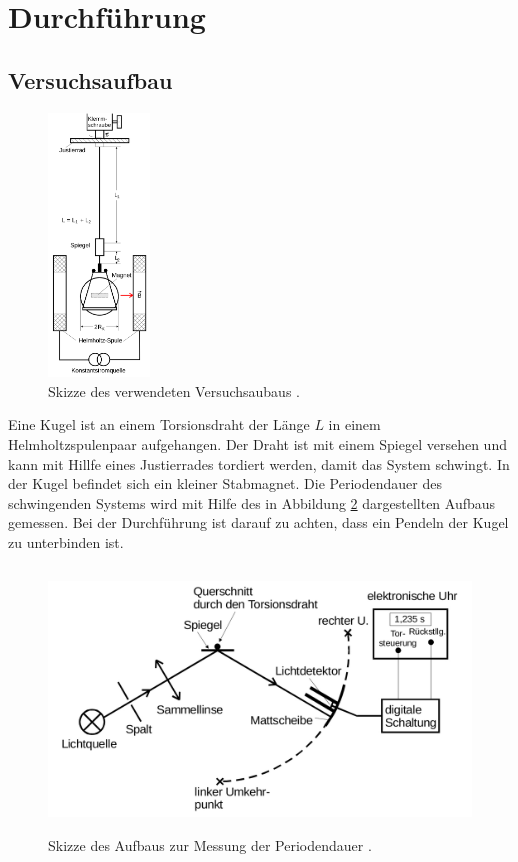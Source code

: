\newpage
\section{Durchführung}
\label{sec:Durchführung}

\subsection{Versuchsaufbau}
\label{sec:Aufbau}

\begin{figure}
  \centering
  \includegraphics[height=7.0cm]{content/Versuchsaufbau.jpg}
  \caption{Skizze des verwendeten Versuchsaubaus  \cite{anleitung}.}
  \label{fig:Versuchsaufbau1}
\end{figure}

Eine Kugel ist an einem Torsionsdraht der Länge $L$ in einem Helmholtzspulenpaar
aufgehangen. Der Draht ist mit einem Spiegel versehen und kann mit
Hillfe eines Justierrades
tordiert werden, damit das System schwingt.
In der Kugel befindet sich ein kleiner Stabmagnet.
Die Periodendauer des
schwingenden Systems wird mit Hilfe
des in Abbildung \ref{fig:Versuchsaufbau2} dargestellten Aufbaus gemessen.
Bei der Durchführung ist darauf zu achten, dass ein Pendeln der Kugel zu
unterbinden ist.

\begin{figure}
  \centering
  \includegraphics[height=7.0cm]{content/Spiegelanlage.jpg}
  \caption{Skizze des Aufbaus zur Messung der Periodendauer \cite{anleitung}.}
  \label{fig:Versuchsaufbau2}
\end{figure}

